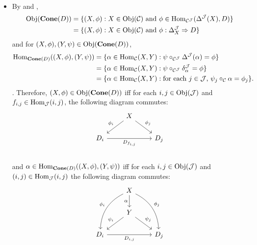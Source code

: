 \documentclass{book}
\begin{document}
	\begin{note}  \
		\begin{itemize}
			\item By  and ,
			\begin{align*}
				\operatorname{Obj}(\operatorname*{\text{\textbf{Cone}}}(D)) 
				& = \{(X, \phi): X \in \operatorname{Obj}(\mathcal{C}) \text{ and } \phi \in \operatorname{Hom}_{\mathcal{C}^{\mathcal{J}}}(\Delta^{\mathcal{J}}(X), D) \} \\
				& = \{(X, \phi): X \in \operatorname{Obj}(\mathcal{C}) \text{ and } \phi: \Delta^{\mathcal{J}}_X \Rightarrow D\}
			\end{align*}
			and for $(X, \phi), (Y, \psi) \in \operatorname{Obj}(\operatorname*{\text{\textbf{Cone}}}(D))$,
			\begin{align*}
				\operatorname{Hom}_{\operatorname*{\text{\textbf{Cone}}}(D)}((X, \phi),(Y, \psi)) 
				& = \{\alpha \in \operatorname{Hom}_{\mathcal{C}}(X, Y): \psi \circ_{\mathcal{C}^{\mathcal{J}}} \Delta^{\mathcal{J}}(\alpha) = \phi \} \\
				& = \{\alpha \in \operatorname{Hom}_{\mathcal{C}}(X, Y): \psi \circ_{\mathcal{C}^{\mathcal{J}}} \delta^{\mathcal{J}}_{\alpha} = \phi \} \\
				& = \{\alpha \in \operatorname{Hom}_{\mathcal{C}}(X, Y): \text{for each $j \in \mathcal{J}$, $\psi_j \circ_{\mathcal{C}} \alpha  = \phi_j$} \}.
			\end{align*}
			. Therefore, $(X, \phi) \in \operatorname{Obj}(\operatorname*{\text{\textbf{Cone}}}(D))$ iff for each $i,j \in \operatorname{Obj}(\mathcal{J})$ and $f_{i,j} \in \operatorname{Hom}_{\mathcal{J}}(i, j)$, the following diagram commutes:
			\[ 
			\begin{tikzcd}
				&  X \arrow[dl, "\phi_i"']  \arrow[dr, "\phi_j"] & \\
				D_i  \arrow[rr, "D_{f_{i,j}}"'] &&  D_j \\ 
			\end{tikzcd}
			\]  
			and $\alpha \in \operatorname{Hom}_{\operatorname*{\text{\textbf{Cone}}}(D)}((X, \phi), (Y, \psi))$ iff  for each $i,j \in \operatorname{Obj}(\mathcal{J})$ and $(i,j) \in \operatorname{Hom}_{\mathcal{J}}(i, j)$ the following diagram commutes: 
			\[ 
			\begin{tikzcd}
				& X \arrow[d, "\al"'] \arrow[bend right=30, swap]{ddl}{\phi_i} \arrow[bend left=30]{ddr}{\phi_j} \\
				&  Y \arrow[dl, "\psi_i"']  \arrow[dr, "\psi_j"] & \\
				D_i  \arrow[rr, "D_{i,j}"'] &&  D_j \\ 
			\end{tikzcd}
\]
\end{itemize}
\end{note}
\end{document}
